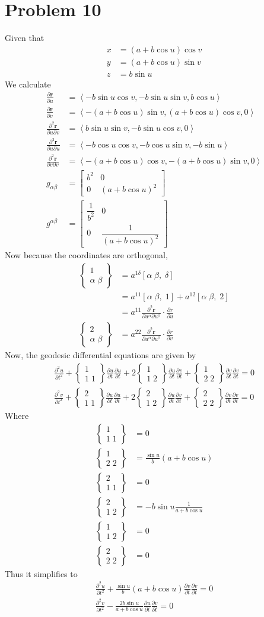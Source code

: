\documentclass[12pt]{article}
\newcommand{\eq}[1]{\begin{align*}#1\end{align*}}
\newcommand{\p}[2]{\frac{\partial#1}{\partial#2}}
\newcommand{\pp}[3]{\frac{\partial^2#1}{\partial#2\partial#3}}
\newcommand{\mat}[2]{\left[\begin{array}{#1}#2\end{array}\right]}
\newcommand{\crsf}[3]{\left[#1\;#2,\;#3\right]}
\newcommand{\crss}[3]{\left\{\begin{array}{c}#1\\#2\;#3\end{array}\right\}}
\begin{document}
\section*{Problem 10}
Given that
\eq{
	x &= (a + b\cos u)\cos v\\
	y &= (a + b\cos u)\sin v\\
	z &= b\sin u
}
We calculate
\eq{
	\p{\bm{r}}{u} &= \left<-b\sin u \cos v, -b\sin u \sin v, b\cos u \right>\\
	\p{\bm{r}}{v} &= \left<-(a + b\cos u)\sin v, (a + b\cos u)\cos v, 0 \right>\\
	\pp{\bm{r}}{u}{v} &= \left<b\sin u\sin v, -b\sin u \cos v, 0 \right>\\
	\pp{\bm{r}}{u}{u} &= \left<-b \cos u \cos v, - b\cos u\sin v, -b\sin u \right>\\
	\pp{\bm{r}}{v}{v} &= \left<-(a + b\cos u)\cos v, -(a + b\cos u)\sin v, 0 \right>\\
	g_{\alpha\beta} &= \mat{cc}{
		b^2 & 0 \\
		0 & (a + b\cos u)^2
	}\\
	g^{\alpha\beta} &= \mat{cc}{
		\dfrac{1}{b^2} & 0 \\
		0 & \dfrac{1}{(a + b\cos u)^2}
	}
}
Now because the coordinates are orthogonal,
\eq{
	\crss{1}{\alpha}{\beta} &= a^{1\delta}\crsf{\alpha}{\beta}{\delta}\\
	&= a^{1 1}\crsf{\alpha}{\beta}{1} + a^{1 2}\crsf{\alpha}{\beta}{2}\\
	&= a^{1 1}\pp{\bm{r}}{u^\alpha}{u^\beta}\cdot\p{r}{u}\\
	\crss{2}{\alpha}{\beta} &= a^{22}\pp{\bm{r}}{u^\alpha}{u^\beta}\cdot\p{r}{v}
}
Now, the geodesic differential equations are given by
\eq{
	\p{^2u}{t^2} + \crss{1}{1}{1}\p{u}{t}\p{u}{t} + 2\crss{1}{1}{2}\p{u}{t}\p{v}{t} + \crss{1}{2}{2}\p{v}{t}\p{v}{t} = 0\\
	\p{^2v}{t^2} + \crss{2}{1}{1}\p{u}{t}\p{u}{t} + 2\crss{2}{1}{2}\p{u}{t}\p{v}{t} + \crss{2}{2}{2}\p{v}{t}\p{v}{t} = 0
}
Where
\eq{
	\crss{1}{1}{1} &= 0\\
	\crss{1}{2}{2} &= \frac{\sin u}{b}(a + b\cos u)\\
	\crss{2}{1}{1} &= 0\\
	\crss{2}{1}{2} &= -b\sin u \frac{1}{a + b\cos u}\\
	\crss{1}{1}{2} &= 0\\
	\crss{2}{2}{2} &= 0
}
Thus it simplifies to
\eq{
	\p{^2u}{t^2} + \frac{\sin u}{b}(a + b\cos u)\p{v}{t}\p{v}{t} = 0\\
	\p{^2v}{t^2} - \frac{2b\sin u}{a + b\cos u}\p{u}{t}\p{v}{t} = 0
}
\end{document}
